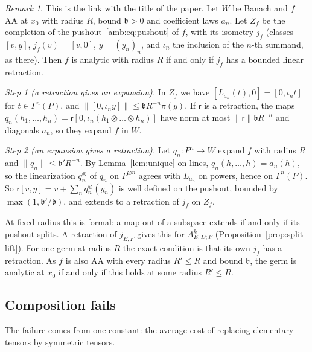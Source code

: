 \documentclass[11pt]{amsart}
\theoremstyle{definition}
\theoremstyle{remark}
\newtheorem{remark}[theorem]{Remark}
\numberwithin{equation}{section}
\newcommand{\norm}[1]{\lVert #1\rVert}
\theoremstyle{plain}
\theoremstyle{definition}
\theoremstyle{plain}
\begin{document}
\begin{remark}\label{amb:rem:splitting}
This is the link with the title of the paper. Let $W$ be Banach and $f$ AA at $x_0$ with radius $R$, bound $\mathfrak b>0$ and coefficient laws $a_n$. Let $Z_f$ be the completion of the pushout~\eqref{amb:eq:pushout} of $f$, with its isometry $j_f$ (classes $[v,y]$, $j_f(v)=[v,0]$, $y=(y_n)_n$, and $\iota_n$ the inclusion of the $n$-th summand, as there). Then $f$ is analytic with radius $R$ if and only if $j_f$ has a bounded linear retraction.

\emph{Step 1 (a retraction gives an expansion).} In $Z_f$ we have $[L_{a_n}(t),0]=[0,\iota_nt]$ for $t\in\Gamma^n(P)$, and $\norm{[0,\iota_ny]}\le \mathfrak bR^{-n}\pi(y)$. If $\mathsf r$ is a retraction, the maps $q_n(h_1,\dots,h_n)=\mathsf r[0,\iota_n(h_1\otimes\dots\otimes h_n)]$ have norm at most $\norm{\mathsf r}\mathfrak bR^{-n}$ and diagonals $a_n$, so they expand $f$ in $W$.

\emph{Step 2 (an expansion gives a retraction).} Let $q_n\colon P^n\to W$ expand $f$ with radius $R$ and $\norm{q_n}\le \mathfrak b'R^{-n}$. By Lemma~\ref{lem:unique} on lines, $q_n(h,\dots,h)=a_n(h)$, so the linearization $q_n^\otimes$ of $q_n$ on $P^{\otimes n}$ agrees with $L_{a_n}$ on powers, hence on $\Gamma^n(P)$. So $\mathsf r[v,y]=v+\sum_nq_n^\otimes(y_n)$ is well defined on the pushout, bounded by $\max(1,\mathfrak b'/\mathfrak b)$, and extends to a retraction of $j_f$ on $Z_f$.

At fixed radius this is formal: a map out of a subspace extends if and only if its pushout splits. A retraction of $j_{E,F}$ gives this for $A^k_{E,D;F}$ (Proposition~\ref{prop:split-lift}). For one germ at radius $R$ the exact condition is that its own $j_f$ has a retraction. As $f$ is also AA with every radius $R'\le R$ and bound $\mathfrak b$, the germ is analytic at $x_0$ if and only if this holds at some radius $R'\le R$.
\end{remark}
\subsection{Composition fails}\label{amb:ssec:failure}

The failure comes from one constant: the average cost of replacing elementary tensors by symmetric tensors.
\end{document}
